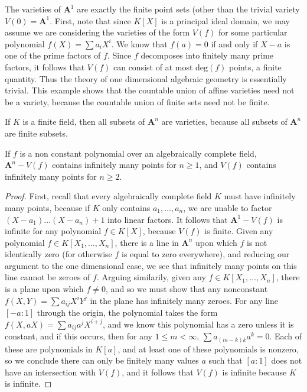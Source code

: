 \begin{example}
    The varieties of $\mathbf{A}^1$ are exactly the finite point sets (other than the trivial variety $V(0) = \mathbf{A}^1$. First, note that since $K[X]$ is a principal ideal domain, we may assume we are considering the varieties of the form $V(f)$ for some particular polynomial $f(X) = \sum a_i X^i$. We know that $f(a) = 0$ if and only if $X - a$ is one of the prime factors of $f$. Since $f$ decomposes into finitely many prime factors, it follows that $V(f)$ can consist of at most $\text{deg}(f)$ points, a finite quantity. Thus the theory of one dimensional algebraic geometry is essentially trivial. This example shows that the countable union of affine varieties need not be a variety, because the countable union of finite sets need not be finite.
\end{example}

\begin{example}
    If $K$ is a finite field, then all subsets of $\mathbf{A}^n$ are varieties, because all subsets of $\mathbf{A}^n$ are finite subsets.
\end{example}

\begin{prop}
    If $f$ is a non constant polynomial over an algebraically complete field, $\mathbf{A}^n - V(f)$ contains infinitely many points for $n \geq 1$, and $V(f)$ contains infinitely many points for $n \geq 2$.
\end{prop}
\begin{proof}
    First, recall that every algebraically complete field $K$ must have infinitely many points, because if $K$ only contains $a_1, \dots, a_n$, we are unable to factor $(X - a_1) \dots (X - a_n) + 1$ into linear factors. It follows that $\mathbf{A}^1 - V(f)$ is infinite for any polynomial $f \in K[X]$, because $V(f)$ is finite. Given any polynomial $f \in K[X_1, \dots, X_n]$, there is a line in $\mathbf{A}^n$ upon which $f$ is not identically zero (for otherwise $f$ is equal to zero everywhere), and reducing our argument to the one dimensional case, we see that infinitely many points on this line cannot be zeroes of $f$. Arguing similarily, given any $f \in K[X_1, \dots, X_n]$, there is a plane upon which $f \neq 0$, and so we must show that any nonconstant $f(X,Y) = \sum a_{ij} X^i Y^j$ in the plane has infinitely many zeroes. For any line $[-a:1]$ through the origin, the polynomial takes the form $f(X,aX) = \sum a_{ij} a^j X^{i+j}$, and we know this polynomial has a zero unless it is constant, and if this occurs, then for any $1 \leq m < \infty$, $\sum a_{(m-k)k} a^k = 0$. Each of these are polynomials in $K[a]$, and at least one of these polynomials is nonzero, so we conclude there can only be finitely many values $a$ such that $[a:1]$ does not have an intersection with $V(f)$, and it follows that $V(f)$ is infinite because $K$ is infinite.
\end{proof}

